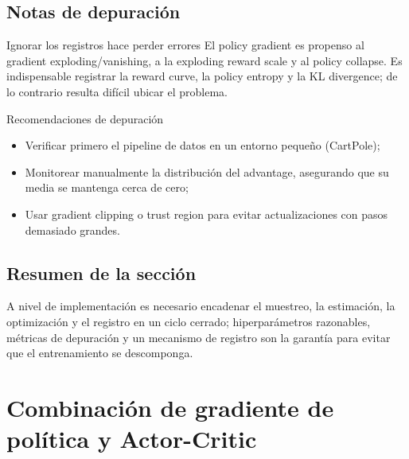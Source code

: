 \documentclass[a4paper]{article}
\begin{document}
\subsection{Notas de depuración}
\begin{warningbox}{Ignorar los registros hace perder errores}
El policy gradient es propenso al gradient exploding/vanishing, a la exploding reward scale y al policy collapse. Es indispensable registrar la reward curve, la policy entropy y la KL divergence; de lo contrario resulta difícil ubicar el problema.
\end{warningbox}

\begin{importantbox}{Recomendaciones de depuración}
\begin{itemize}
    \item Verificar primero el pipeline de datos en un entorno pequeño (CartPole);
    \item Monitorear manualmente la distribución del advantage, asegurando que su media se mantenga cerca de cero;
    \item Usar gradient clipping o trust region para evitar actualizaciones con pasos demasiado grandes.
\end{itemize}
\end{importantbox}

\subsection{Resumen de la sección}
A nivel de implementación es necesario encadenar el muestreo, la estimación, la optimización y el registro en un ciclo cerrado; hiperparámetros razonables, métricas de depuración y un mecanismo de registro son la garantía para evitar que el entrenamiento se descomponga.
\section{Combinación de gradiente de política y Actor-Critic}
\end{document}

